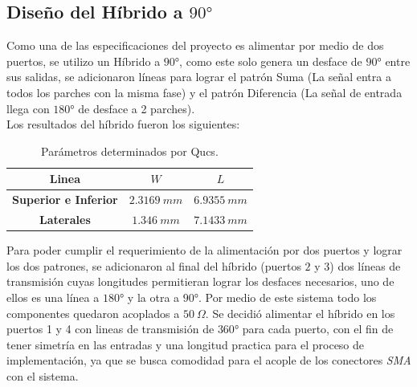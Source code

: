 \documentclass[twocolumn]{IEEEtran}
\begin{document}
\subsection{Diseño del Híbrido a $90°$}
\noindent
Como una de las especificaciones del proyecto es alimentar por medio de dos puertos, se utilizo un Híbrido a $90°$, como este solo genera un desface de $90°$ entre sus salidas, se adicionaron líneas para lograr el patrón Suma (La señal entra a todos los parches con la misma fase) y el patrón Diferencia (La señal de entrada llega con $180°$ de desface a 2 parches).\\
Los resultados del híbrido fueron los siguientes:
\begin{table}[H]
	\centering
\begin{tabular}{|c|c|c|}\hline
\textbf{Linea} & \textbf{$W$} & \textbf{$L$} \\ \hline
\textbf{Superior e Inferior} & $2.3169\ mm$ & $6.9355\ mm$ \\ \hline
\textbf{Laterales} & $1.346\ mm$ & $7.1433\ mm$ \\ \hline
    \end{tabular}
	\caption{Parámetros determinados por Qucs.}
	\label{tab1}
\end{table}
\noindent
Para poder cumplir el requerimiento de la alimentación por dos puertos y lograr los dos patrones, se adicionaron al final del híbrido (puertos $2$ y $3$) dos líneas de transmisión cuyas longitudes permitieran lograr los desfaces necesarios, uno de ellos es una línea a $180°$ y la otra a $90°$. Por medio de este sistema todo los componentes quedaron acoplados a $50\ \Omega$. Se decidió alimentar el híbrido en los puertos 1 y 4 con lineas de transmisión de $360°$ para cada puerto, con el fin de tener simetría en las entradas y una longitud practica para el proceso de implementación, ya que se busca comodidad para el acople de los conectores \textit{SMA} con el sistema.
\end{document}
